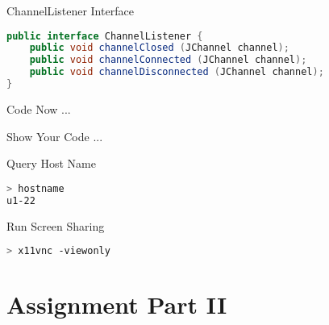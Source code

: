 \begin{frame}[fragile]{ChannelListener Interface}
\begin{lstlisting}[language=java,style=mini]
public interface ChannelListener {
    public void channelClosed (JChannel channel);
    public void channelConnected (JChannel channel);
    public void channelDisconnected (JChannel channel);
}
\end{lstlisting}
\end{frame}


\begin{frame}{Code Now ...}
\end{frame}


\begin{frame}[fragile]{Show Your Code ...}
    \begin{block}{Query Host Name}
\begin{lstlisting}[language=bash,style=mini]
> hostname
u1-22
\end{lstlisting}
    \end{block}
    \begin{block}{Run Screen Sharing}
\begin{lstlisting}[language=bash,style=mini]
> x11vnc -viewonly
\end{lstlisting}
    \end{block}
\end{frame}


\section{Assignment Part II}



